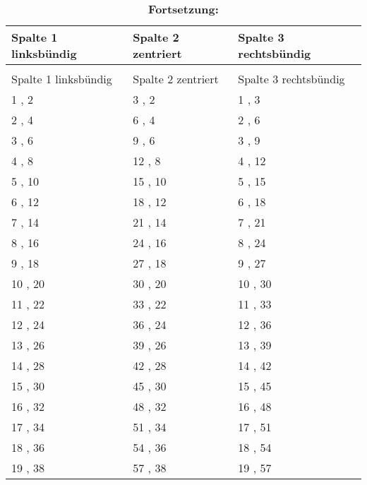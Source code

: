\begin{longtabu} to 
	\caption{Tabelle über mehrere Seiten}\label{tab:mehrere Seiten Anhang} \\
	\toprule
	Spalte 1 linksbündig & Spalte 2 zentriert & Spalte 3 rechtsbündig \\
	\midrule
	\endfirsthead
	\caption*{\textbf{Fortsetzung:} } \\
	\toprule
	Spalte 1 linksbündig & Spalte 2 zentriert & Spalte 3 rechtsbündig \\
	\midrule
	\endhead
	\bottomrule
	\endfoot
	\bottomrule    
	\endlastfoot
	1 , 2                           & 3 , 2                           & 1 , 3 \\
	2 , 4                           & 6 , 4                           & 2 , 6 \\
	3 , 6                           & 9 , 6                           & 3 , 9 \\
	4 , 8                           & 12 , 8                           & 4 , 12 \\
	5 , 10                           & 15 , 10                           & 5 , 15 \\
	6 , 12                           & 18 , 12                           & 6 , 18 \\
	7 , 14                           & 21 , 14                           & 7 , 21 \\
	8 , 16                           & 24 , 16                           & 8 , 24 \\
	9 , 18                           & 27 , 18                           & 9 , 27 \\
	10 , 20                           & 30 , 20                           & 10 , 30 \\
	11 , 22                           & 33 , 22                           & 11 , 33 \\
	12 , 24                           & 36 , 24                           & 12 , 36 \\
	13 , 26                           & 39 , 26                           & 13 , 39 \\
	14 , 28                           & 42 , 28                           & 14 , 42 \\
	15 , 30                           & 45 , 30                           & 15 , 45 \\
	16 , 32                           & 48 , 32                           & 16 , 48 \\
	17 , 34                           & 51 , 34                           & 17 , 51 \\
	18 , 36                           & 54 , 36                           & 18 , 54 \\
	19 , 38                           & 57 , 38                           & 19 , 57 \\
\end{longtabu}
